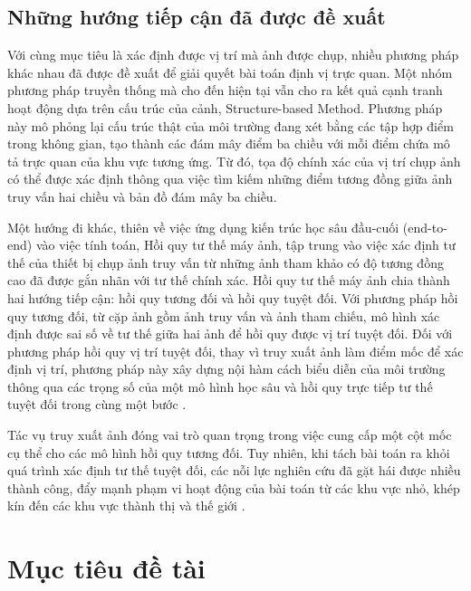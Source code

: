 \subsection{Những hướng tiếp cận đã được đề xuất}

Với cùng mục tiêu là xác định được vị trí mà ảnh được chụp, nhiều phương pháp khác nhau đã được đề xuất để giải quyết bài toán định vị trực quan. Một nhóm phương pháp truyền thống mà cho đến hiện tại vẫn cho ra kết quả cạnh tranh hoạt động dựa trên cấu trúc của cảnh, Structure-based Method. Phương pháp này mô phỏng lại cấu trúc thật của môi trường đang xét bằng các tập hợp điểm trong không gian, tạo thành các đám mây điểm ba chiều với mỗi điểm chứa mô tả trực quan của khu vực tương ứng. Từ đó, tọa độ chính xác của vị trí chụp ảnh có thể được xác định thông qua việc tìm kiếm những điểm tương đồng giữa ảnh truy vấn hai chiều và bản đồ đám mây ba chiều.

Một hướng đi khác, thiên về việc ứng dụng kiến trúc học sâu đầu-cuối (end-to-end) vào việc tính toán, Hồi quy tư thế máy ảnh, tập trung vào việc xác định tư thế của thiết bị chụp ảnh truy vấn từ những ảnh tham khảo có độ tương đồng cao đã được gắn nhãn với tư thế chính xác. Hồi quy tư thế máy ảnh chia thành hai hướng tiếp cận: hồi quy tương đối và hồi quy tuyệt đối. Với phương pháp hồi quy tương đối, từ cặp ảnh gồm ảnh truy vấn và ảnh tham chiếu, mô hình xác định được sai số về tư thế giữa hai ảnh \cite{zhou2020learn} để hồi quy được vị trí tuyệt đối. Đối với phương pháp hồi quy vị trí tuyệt đối, thay vì truy xuất ảnh làm điểm mốc để xác định vị trí, phương pháp này xây dựng nội hàm cách biểu diễn của môi trường thông qua các trọng số của một mô hình học sâu và hồi quy trực tiếp tư thế tuyệt đối trong cùng một bước \cite{kendall2016posenet}.

Tác vụ truy xuất ảnh đóng vai trò quan trọng trong việc cung cấp một cột mốc cụ thể cho các mô hình hồi quy tương đối. Tuy nhiên, khi tách bài toán ra khỏi quá trình xác định tư thế tuyệt đối, các nỗi lực nghiên cứu đã gặt hái được nhiều thành công, đẩy mạnh phạm vi hoạt động của bài toán từ các khu vực nhỏ, khép kín đến các khu vực thành thị và thế giới \cite{berton2022rethinking, keetha2023anyloc, alibey2023mixvpr}.

\section{Mục tiêu đề tài}

